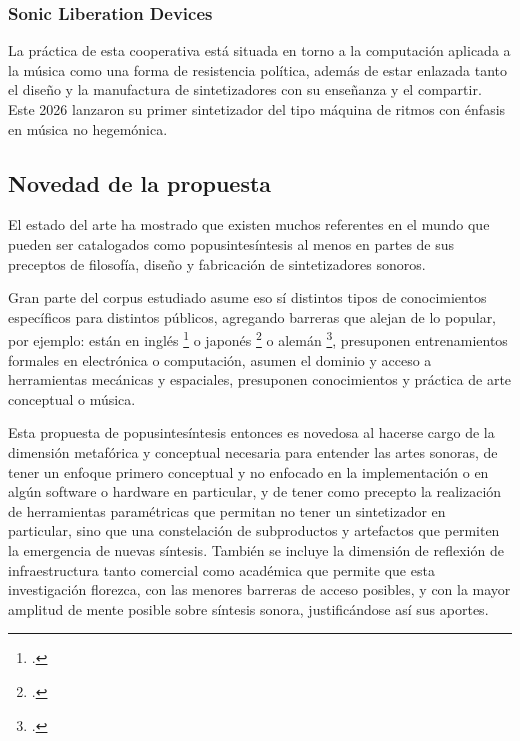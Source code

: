\documentclass[../proyecto.tex]{subfiles}
\begin{document}
\subsubsection{Sonic Liberation Devices}

La práctica de esta cooperativa está situada en torno a la computación aplicada a la música como una forma de resistencia política, además de estar enlazada tanto el diseño y la manufactura de sintetizadores con su enseñanza y el compartir. Este 2026 lanzaron su primer sintetizador del tipo máquina de ritmos con énfasis en música no hegemónica.

\subsection{Novedad de la propuesta}

El estado del arte ha mostrado que existen muchos referentes en el mundo que pueden ser catalogados como popusintesíntesis al menos en partes de sus preceptos de filosofía, diseño y fabricación de sintetizadores sonoros.

Gran parte del corpus estudiado asume eso sí distintos tipos de conocimientos específicos para distintos públicos, agregando barreras que alejan de lo popular, por ejemplo: están en inglés \footcite{edstrom_arduino_2016} o japonés \footcite{oohashi_strange_2021} o alemán \footcite{kruse_modulare_2024}, presuponen entrenamientos formales en electrónica o computación, asumen el dominio y acceso a herramientas mecánicas y espaciales, presuponen conocimientos y práctica de arte conceptual o música.

Esta propuesta de popusintesíntesis entonces es novedosa al hacerse cargo de la dimensión metafórica y conceptual necesaria para entender las artes sonoras, de tener un enfoque primero conceptual y no enfocado en la implementación o en algún software o hardware en particular, y de tener como precepto la realización de herramientas paramétricas que permitan no tener un sintetizador en particular, sino que una constelación de subproductos y artefactos que permiten la emergencia de nuevas síntesis. También se incluye la dimensión de reflexión de infraestructura tanto comercial como académica que permite que esta investigación florezca, con las menores barreras de acceso posibles, y con la mayor amplitud de mente posible sobre síntesis sonora, justificándose así sus aportes.
\end{document}

